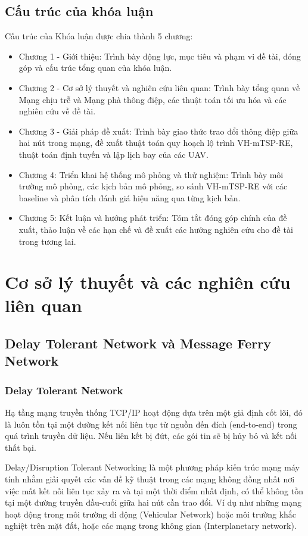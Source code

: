 \documentclass[a4paper]{article}
\begin{document}
\subsection{Cấu trúc của khóa luận}
Cấu trúc của Khóa luận được chia thành 5 chương:
\begin{itemize}
  \item Chương 1 - Giới thiệu: Trình bày động lực, mục tiêu và phạm vi đề tài, đóng góp và cấu trúc tổng quan của khóa luận.
  \item Chương 2 - Cơ sở lý thuyết và nghiên cứu liên quan: Trình bày tổng quan về Mạng chịu trễ và Mạng phà thông điệp, các thuật toán tối ưu hóa và các nghiên cứu về đề tài.
  \item Chương 3 - Giải pháp đề xuất: Trình bày giao thức trao đổi thông điệp giữa hai nút trong mạng, đề xuất thuật toán quy hoạch lộ trình VH-mTSP-RE, thuật toán định tuyến và lập lịch bay của các UAV.
  \item Chương 4: Triển khai hệ thống mô phỏng và thử nghiệm: Trình bày môi trường mô phỏng, các kịch bản mô phỏng, so sánh VH-mTSP-RE với các baseline và phân tích đánh giá hiệu năng qua từng kịch bản.
  \item Chương 5: Kết luận và hướng phát triển: Tóm tắt đóng góp chính của đề xuất, thảo luận về các hạn chế và đề xuất các hướng nghiên cứu cho đề tài trong tương lai.
\end{itemize}

\section{Cơ sở lý thuyết và các nghiên cứu liên quan}
\subsection{Delay Tolerant Network và Message Ferry Network}
\subsubsection{Delay Tolerant Network}
Hạ tầng mạng truyền thống TCP/IP hoạt động dựa trên một giả định cốt lõi, đó là luôn tồn tại một đường kết nối liên tục từ nguồn đến đích (end-to-end) trong quá trình truyền dữ liệu. Nếu liên kết bị đứt, các gói tin sẽ bị hủy bỏ và kết nối thất bại.

Delay/Disruption Tolerant Networking là một phương pháp kiến trúc mạng máy tính nhằm giải quyết các vấn đề kỹ thuật trong các mạng không đồng nhất nơi việc mất kết nối liên tục xảy ra và tại một thời điểm nhất định, có thể không tồn tại một đường truyền đầu-cuối giữa hai nút cần trao đổi.
Ví dụ như những mạng hoạt động trong môi trường di động (Vehicular Network) hoặc môi trường khắc nghiệt trên mặt đất, hoặc các mạng trong không gian (Interplanetary network).
\end{document}
